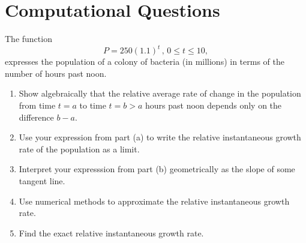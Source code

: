\documentclass{ximera}
\begin{document}
\section{Computational Questions}

\begin{question} \label{Qpvem3r34}
The function
\[
        P = 250 (1.1)^t \, , \, 0\leq t \leq 10,
\]
expresses the population of a colony of bacteria (in millions) in terms of the number of hours past noon.

\begin{enumerate}
\item Show algebraically that the relative average rate of change in the population from time $t=a$ to time $t=b>a$ hours past noon depends only on the difference $b-a$.

\item Use your expression from part (a) to write the relative instantaneous growth rate of the population as a limit.

\item Interpret your expresssion from part (b) geometrically as the slope of some tangent line.

\item Use numerical methods to approximate the relative instantaneous growth rate.

\item Find the exact relative instantaneous growth rate.

\end{enumerate}
\end{question}
\end{document}
